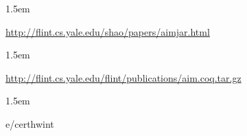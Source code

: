 \documentclass[12pt,twoside]{article}
\begin{document}
\begin{mddefinitions}%


\begin{mdbmarginx}{}{}{}{1.5em}%
\begin{mddefdata}%
\href{http://flint.cs.yale.edu/shao/papers/aimjar.html}{{\ttfamily http://\hspace{0pt}flint.\hspace{0pt}cs.\hspace{0pt}yale.\hspace{0pt}edu/\hspace{0pt}shao/\hspace{0pt}papers/\hspace{0pt}aimjar.\hspace{0pt}html}}
\end{mddefdata}%
\end{mdbmarginx}%


\begin{mdbmarginx}{}{}{}{1.5em}%
\begin{mddefdata}%
\href{http://flint.cs.yale.edu/flint/publications/aim.coq.tar.gz}{{\ttfamily http://\hspace{0pt}flint.\hspace{0pt}cs.\hspace{0pt}yale.\hspace{0pt}edu/\hspace{0pt}flint/\hspace{0pt}publications/\hspace{0pt}aim.\hspace{0pt}coq.\hspace{0pt}tar.\hspace{0pt}gz}}
\end{mddefdata}%
\end{mdbmarginx}%


\begin{mdbmarginx}{}{}{}{1.5em}%
\begin{mddefdata}%
e/certhwint%
\end{mddefdata}%
\end{mdbmarginx}%
\end{mddefinitions}%
\end{document}

